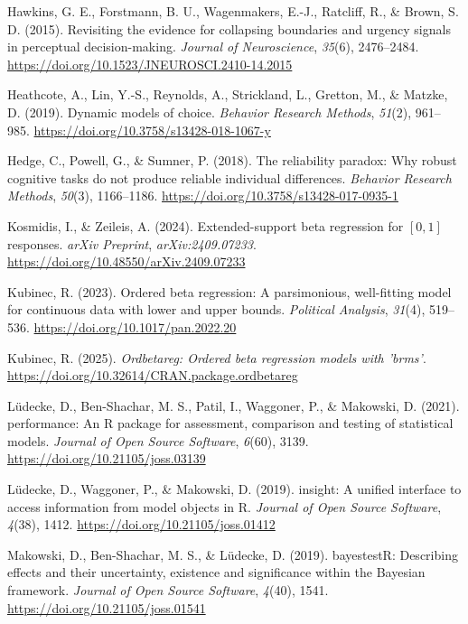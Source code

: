 \documentclass[
  jou,
  floatsintext,
  longtable,
  nolmodern,
  notxfonts,
  notimes,
  12pt,
  colorlinks=true,linkcolor=blue,citecolor=blue,urlcolor=blue]{apa7}
\newlength{\cslhangindent}
\newenvironment{CSLReferences}[2] %
 {\begin{list}{}{%
  \setlength{\itemindent}{0pt}
  \setlength{\leftmargin}{0pt}
  \setlength{\parsep}{0pt}
  \ifodd #1
   \setlength{\leftmargin}{\cslhangindent}
   \setlength{\itemindent}{-1\cslhangindent}
  \fi
  \setlength{\itemsep}{#2\baselineskip}}}
 {\end{list}}
\begin{document}
\begin{CSLReferences}{1}{0}
Hawkins, G. E., Forstmann, B. U., Wagenmakers, E.-J., Ratcliff, R., \&
Brown, S. D. (2015). Revisiting the evidence for collapsing boundaries
and urgency signals in perceptual decision-making. \emph{Journal of
Neuroscience}, \emph{35}(6), 2476--2484.
\url{https://doi.org/10.1523/JNEUROSCI.2410-14.2015}

Heathcote, A., Lin, Y.-S., Reynolds, A., Strickland, L., Gretton, M., \&
Matzke, D. (2019). Dynamic models of choice. \emph{Behavior Research
Methods}, \emph{51}(2), 961--985.
\url{https://doi.org/10.3758/s13428-018-1067-y}

Hedge, C., Powell, G., \& Sumner, P. (2018). The reliability paradox:
Why robust cognitive tasks do not produce reliable individual
differences. \emph{Behavior Research Methods}, \emph{50}(3), 1166--1186.
\url{https://doi.org/10.3758/s13428-017-0935-1}

Kosmidis, I., \& Zeileis, A. (2024). Extended-support beta regression
for \([0, 1]\) responses. \emph{arXiv Preprint},
\emph{arXiv:2409.07233}. \url{https://doi.org/10.48550/arXiv.2409.07233}

Kubinec, R. (2023). Ordered beta regression: A parsimonious,
well-fitting model for continuous data with lower and upper bounds.
\emph{Political Analysis}, \emph{31}(4), 519--536.
\url{https://doi.org/10.1017/pan.2022.20}

Kubinec, R. (2025). \emph{Ordbetareg: Ordered beta regression models
with 'brms'}. \url{https://doi.org/10.32614/CRAN.package.ordbetareg}

Lüdecke, D., Ben-Shachar, M. S., Patil, I., Waggoner, P., \& Makowski,
D. (2021). {performance}: An {R} package for assessment, comparison and
testing of statistical models. \emph{Journal of Open Source Software},
\emph{6}(60), 3139. \url{https://doi.org/10.21105/joss.03139}

Lüdecke, D., Waggoner, P., \& Makowski, D. (2019). {insight}: A unified
interface to access information from model objects in {R}. \emph{Journal
of Open Source Software}, \emph{4}(38), 1412.
\url{https://doi.org/10.21105/joss.01412}

Makowski, D., Ben-Shachar, M. S., \& Lüdecke, D. (2019). {bayestestR}:
Describing effects and their uncertainty, existence and significance
within the {Bayesian} framework. \emph{Journal of Open Source Software},
\emph{4}(40), 1541. \url{https://doi.org/10.21105/joss.01541}


\end{CSLReferences}
\end{document}

